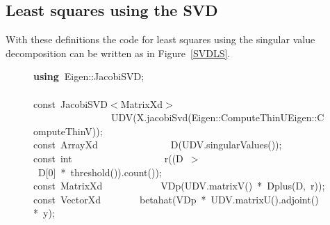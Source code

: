 \documentclass[shortnames,article]{jss}
\newcommand{\hlstd}[1]{\textcolor[rgb]{0,0,0}{#1}}
\newcommand{\hlnum}[1]{\textcolor[rgb]{0,0,0}{#1}}
\newcommand{\hlopt}[1]{\textcolor[rgb]{0,0,0}{#1}}
\newcommand{\hlkwa}[1]{\textcolor[rgb]{0.61,0.13,0.93}{\bf{#1}}}
\newcommand{\hlkwb}[1]{\textcolor[rgb]{0.13,0.54,0.13}{#1}}
\newcommand{\hlkwd}[1]{\textcolor[rgb]{0,0,0}{#1}}
\begin{document}
\subsection{Least squares using the SVD}
\label{sec:SVDls}

With these definitions the code for least squares using the singular
value decomposition can be written as in Figure~\ref{SVDLS}.
\begin{figure}[htb]
    \noindent
    \ttfamily
    \hlstd{}\hlkwa{using\ }\hlstd{Eigen}\hlopt{::}\hlstd{JacobiSVD}\hlopt{;}\hspace*{\fill}\\
    \hlstd{}\hspace*{\fill}\\
    \hlkwb{const\ }\hlstd{JacobiSVD}\hlopt{$<$}\hlstd{MatrixXd}\hlopt{$>$}\hspace*{\fill}\\
    \hlstd{}\hlstd{\ \ \ \ \ \ \ \ \ \ \ \ \ \ \ \ }\hlstd{}\hlkwd{UDV}\hlstd{}\hlopt{(}\hlstd{X}\hlopt{.}\hlstd{}\hlkwd{jacobiSvd}\hlstd{}\hlopt{(}\hlstd{Eigen}\hlopt{::}\hlstd{ComputeThinU}\hlopt{\textbar }\hlstd{Eigen}\hlopt{::}\hlstd{ComputeThinV}\hlopt{));}\hspace*{\fill}\\
    \hlstd{}\hlkwb{const\ }\hlstd{ArrayXd}\hlstd{\ \ \ \ \ \ \ \ \ \ \ \ \ \ \ }\hlstd{}\hlkwd{D}\hlstd{}\hlopt{(}\hlstd{UDV}\hlopt{.}\hlstd{}\hlkwd{singularValues}\hlstd{}\hlopt{());}\hspace*{\fill}\\
    \hlstd{}\hlkwb{const\ int}\hlstd{\ \ \ \ \ \ \ \ \ \ \ \ \ \ \ \ \ \ \ }\hlkwb{}\hlstd{}\hlkwd{r}\hlstd{}\hlopt{((}\hlstd{D\ }\hlopt{$>$\ }\hlstd{D}\hlopt{{[}}\hlstd{}\hlnum{0}\hlstd{}\hlopt{{]}\ {*}\ }\hlstd{}\hlkwd{threshold}\hlstd{}\hlopt{()).}\hlstd{}\hlkwd{count}\hlstd{}\hlopt{());}\hspace*{\fill}\\
    \hlstd{}\hlkwb{const\ }\hlstd{MatrixXd}\hlstd{\ \ \ \ \ \ \ \ \ \ \ \ }\hlstd{}\hlkwd{VDp}\hlstd{}\hlopt{(}\hlstd{UDV}\hlopt{.}\hlstd{}\hlkwd{matrixV}\hlstd{}\hlopt{()\ {*}\ }\hlstd{}\hlkwd{Dplus}\hlstd{}\hlopt{(}\hlstd{D}\hlopt{,\ }\hlstd{r}\hlopt{));}\hspace*{\fill}\\
    \hlstd{}\hlkwb{const\ }\hlstd{VectorXd}\hlstd{\ \ \ \ \ \ \ \ }\hlstd{}\hlkwd{betahat}\hlstd{}\hlopt{(}\hlstd{VDp\ }\hlopt{{*}\ }\hlstd{UDV}\hlopt{.}\hlstd{}\hlkwd{matrixU}\hlstd{}\hlopt{().}\hlstd{}\hlkwd{adjoint}\hlstd{}\hlopt{()\ {*}\ }\hlstd{y}\hlopt{);}\hspace*{\fill}\\

\end{figure}
\end{document}
